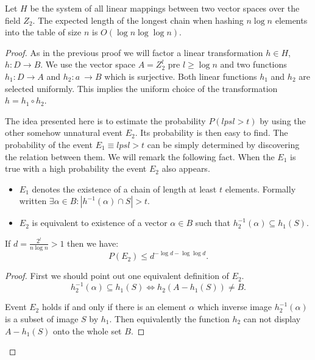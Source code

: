 \begin{theorem}
\label{theorem-n-logn-to-n}
Let $H$ be the system of all linear mappings between two vector spaces over the field $Z_2$. The expected length of the longest chain when hashing $n \log n$ elements into the table of size $n$ is $O(\log n \log \log n)$.
\end{theorem}
\begin{proof}
As in the previous proof we will factor a linear transformation $h \in H$, $h: D \rightarrow B$. We use the vector space $A = Z_2^l$ pre $l \geq \log n$ and two functions $h_1: D \rightarrow A$ and $h_2: a~\rightarrow B$ which is surjective. Both linear functions $h_1$ and $h_2$ are selected uniformly. This implies the uniform choice of the transformation $h = h_1 \circ h_2$.

The idea presented here is to estimate the probability $P(lpsl > t)$ by using the other somehow unnatural event $E_2$. Its probability is then easy to find. The probability of the event $E_1 \equiv lpsl > t$ can be simply determined by discovering the relation between them. We will remark the following fact. When the $E_1$ is true with a high probability the event $E_2$ also appears.

\begin{itemize}
\item $E_1$ denotes the existence of a chain of length at least $t$ elements. Formally written $\exists \alpha \in B: | h^{-1}(\alpha) \cap S | > t$.
\item $E_2$ is equivalent to existence of a vector $\alpha \in B$ such that $h_2^{-1}(\alpha) \subseteq h_1(S)$.
\end{itemize}

\begin{remark}
\label{remark-e2-probability}
If $d = \frac{2^l}{n \log n} > 1$ then we have:
\begin{displaymath}
P(E_2) \leq d^{-\log d - \log \log d}\textit{.}
\end{displaymath}
\end{remark}
\begin{proof}
First we should point out one equivalent definition of $E_2$.
\begin{displaymath}
h_2^{-1}(\alpha) \subseteq h_1(S) \Leftrightarrow h_2(A - h_1(S)) \neq B \textit{.}
\end{displaymath}

Event $E_2$ holds if and only if there is an element $\alpha$ which inverse image $h_2^{-1}(\alpha)$ is a subset of image $S$ by $h_1$. Then equivalently the function $h_2$ can not display $A - h_1(S)$ onto the whole set $B$.


\end{proof}
\end{proof}
